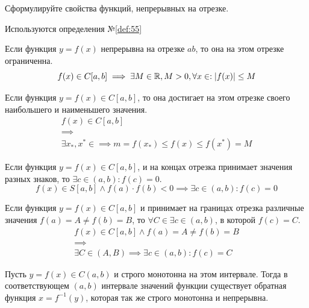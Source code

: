 \begin{question}
    Сформулируйте свойства функций, непрерывных на отрезке.
\end{question}
\begin{used}
    Используются определения №\ref{def:55}
\end{used}
\begin{theorem}
    Если функция $y = f(x)$ непрерывна на отрезке $ab$, то она на этом отрезке ограниченна. \[
        f(x) \in C[a, b] \implies \exists M \in \mathbb{R}, M > 0, \forall x \in : |f(x)| \le  M
    \] 
\end{theorem}
\begin{theorem}
    Если функция $y = f(x) \in C[a, b]$, то она достигает на этом отрезке своего наибольшего и наименьшего значения.
    \begin{gather*}
        f(x) \in C[a, b] \\
        \implies \\
        \exists x_*, x^* \in \implies m = f(x_*) \le f(x) \le f(x^*) = M
    \end{gather*}
\end{theorem}
\begin{theorem}
    Если функция $y = f(x) \in C[a, b]$, и на концах отрезка принимает значения разных знаков, то $\exists c \in (a, b) : f(c) = 0$. \[
        f(x) \in S[a, b] \land f(a) \cdot f(b) < 0 \implies \exists  c \in (a, b) : f(c) = 0
    \] 
\end{theorem}
\begin{theorem}
    Если функция $y = f(x) \in C[a, b]$ и принимает на границах отрезка различные значения $f(a) = A \neq f(b) = B$, то $\forall C \in \exists c \in (a, b)$, в которой $f(c) = C$.
    \begin{gather*}
        f(x) \in C[a, b] \land f(a) = A \neq f(b) = B \\
        \implies \\
        \exists C \in (A, B) \implies \exists c \in (a, b) : f(c) = C
    \end{gather*}
\end{theorem}
\begin{theorem}
    Пусть $y = f(x) \in C(a, b)$ и строго монотонна на этом интервале. Тогда в соответствующем $(a, b)$ интервале значений функции существует обратная функция $x = f^{-1}(y)$, которая так же строго монотонна и непрерывна.
\end{theorem}
\pagebreak


